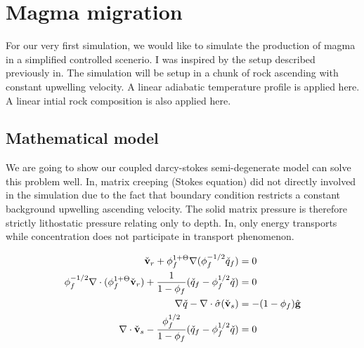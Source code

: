 \section{Magma migration}
For our very first simulation, we would like to simulate the 
production of magma in a simplified controlled scenerio.
I was inspired by the setup described previously in\cite{ModellingMeltingRates}.
The simulation will be setup in a chunk of rock ascending
with constant upwelling velocity.
A linear adiabatic temperature profile is applied here.
A linear intial rock composition is also applied here.

\subsection{Mathematical model}
We are going to show our coupled darcy-stokes semi-degenerate model
can solve this problem well.
In\cite{ModellingMeltingRates}, matrix creeping (Stokes equation) did not directly
involved in the simulation due to the fact that boundary condition restricts a 
constant background upwelling ascending velocity.
The solid matrix pressure is therefore strictly lithostatic pressure relating 
only to depth.
In\cite{ModellingMeltingRates}, only energy transports while concentration does not
participate in transport phenomenon. 

\begin{equation}
		  \begin{aligned}
					 \check{\bold{v}}_r + \phi_f^{1+\Theta}\nabla (\phi_f^{-1/2}\check{q}_f) &= 0\\
					 \phi_f^{-1/2}\nabla \cdot (\phi_f^{1+\Theta} \check{\bold{v}}_r) + \frac{1}{1-\phi_f}(\check{q}_f - \phi_f^{1/2}\check{q}) &=0 \\
					 \nabla \check{q} - \nabla \cdot \hat{\sigma}(\check{\bold{v}}_s) &= -(1-\phi_f)\hat{\bold{g}} \\
					 \nabla \cdot \check{\bold{v}}_s - \frac{\phi_f^{1/2}}{1-\phi_f}(\check{q}_f - \phi_f^{1/2}\check{q}) &= 0
		  \end{aligned}
\end{equation}

